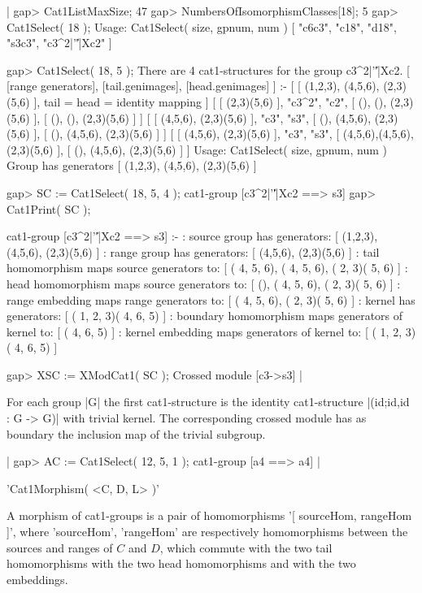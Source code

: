 |    gap> Cat1ListMaxSize;
    47
    gap> NumbersOfIsomorphismClasses[18];
    5
    gap> Cat1Select( 18 );
    Usage:  Cat1Select( size, gpnum, num )
    [ "c6c3", "c18", "d18", "s3c3", "c3^2|'\|'|Xc2" ]

    gap> Cat1Select( 18, 5 );
    There are 4 cat1-structures for the group c3^2|'\|'|Xc2.
    [ [range generators], [tail.genimages], [head.genimages] ]  :- 
    [ [ (1,2,3), (4,5,6), (2,3)(5,6) ],  tail = head = identity mapping ]
    [ [ (2,3)(5,6) ], "c3^2", "c2", [ (), (), (2,3)(5,6) ],
        [ (), (), (2,3)(5,6) ] ]
    [ [ (4,5,6), (2,3)(5,6) ], "c3", "s3", [ (), (4,5,6), (2,3)(5,6) ], 
        [ (), (4,5,6), (2,3)(5,6) ] ]
    [ [ (4,5,6), (2,3)(5,6) ], "c3", "s3", [ (4,5,6),(4,5,6),(2,3)(5,6) ],
        [ (), (4,5,6), (2,3)(5,6) ] ]
    Usage:  Cat1Select( size, gpnum, num )
    Group has generators [ (1,2,3), (4,5,6), (2,3)(5,6) ]
 
    gap> SC := Cat1Select( 18, 5, 4 );
    cat1-group [c3^2|'\|'|Xc2 ==> s3] 
    gap> Cat1Print( SC );

    cat1-group [c3^2|'\|'|Xc2 ==> s3] :- 
    : source group has generators:
      [ (1,2,3), (4,5,6), (2,3)(5,6) ]
    :  range group has generators:
      [ (4,5,6), (2,3)(5,6) ]
    : tail homomorphism maps source generators to:
      [ ( 4, 5, 6), ( 4, 5, 6), ( 2, 3)( 5, 6) ]
    : head homomorphism maps source generators to:
      [ (), ( 4, 5, 6), ( 2, 3)( 5, 6) ]
    : range embedding maps range generators to:
      [ ( 4, 5, 6), ( 2, 3)( 5, 6) ]
    : kernel has generators:
      [ ( 1, 2, 3)( 4, 6, 5) ]
    : boundary homomorphism maps generators of kernel to:
      [ ( 4, 6, 5) ]
    : kernel embedding maps generators of kernel to:
      [ ( 1, 2, 3)( 4, 6, 5) ]

    gap> XSC := XModCat1( SC );
    Crossed module [c3->s3]   |

For each group |G| the first cat1-structure is the identity cat1-structure
|(id;id,id : G -> G)|  with trivial kernel.  The corresponding crossed
module has as boundary the inclusion map of the trivial subgroup.

|    gap> AC := Cat1Select( 12, 5, 1 );
    cat1-group [a4 ==> a4]   |

%

'Cat1Morphism( <C, D, L> )'

A morphism of cat1-groups is a pair of homomorphisms
'[ sourceHom, rangeHom ]',  where  'sourceHom', 'rangeHom'
are respectively homomorphisms between the sources and ranges
of  $C$  and  $D$, which commute with the two tail homomorphisms
with the two head homomorphisms and with the two embeddings.

